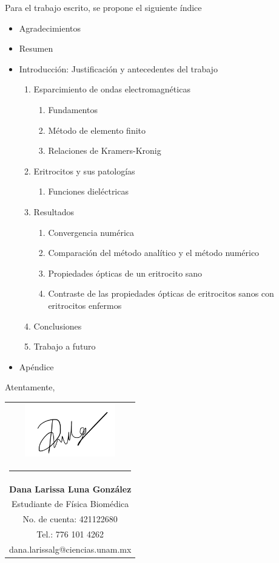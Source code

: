 \documentclass[11pt,letterpaper]{article}
\begin{document}
	Para el trabajo escrito, se propone el siguiente índice
	\begin{itemize}
		\setlength\itemsep{0.05em}
		\item  Agradecimientos
		\item  Resumen
		\item  Introducción: Justificación y antecedentes del trabajo
		\begin{enumerate}
			\item Esparcimiento de ondas electromagnéticas
			\begin{enumerate}[label=1.\arabic*]
				\item Fundamentos
				\item Método de elemento finito
				\item Relaciones de Kramers-Kronig
			\end{enumerate}
			\item Eritrocitos y sus patologías
			\begin{enumerate} [label=2.\arabic*]
				\item Funciones dieléctricas
			\end{enumerate}
			\item Resultados
			\begin{enumerate} [label=3.\arabic*]
				\item Convergencia numérica
				\item Comparación del método analítico y el método numérico
				\item Propiedades ópticas de un eritrocito sano
				\item  Contraste de las propiedades ópticas de eritrocitos sanos con eritrocitos enfermos
			\end{enumerate}
			\item Conclusiones
			\item Trabajo a futuro	
		\end{enumerate}
		\item Apéndice		
	\end{itemize}
	\newpage
	Atentamente,
	
	\vspace{1cm}
	{\hspace{0.7cm}\begin{tabular}{c}
		\includegraphics[height=2.3cm]{firma}\\[-0.5cm] %
		\rule{5.5cm}{0.4pt} \\[0.2cm]
		\textbf{Dana Larissa Luna González} \\
		Estudiante de Física Biomédica \\
		No. de cuenta: 421122680 \\
		Tel.: 776 101 4262 \\
		dana.larissalg@ciencias.unam.mx \\
	\end{tabular}}
\end{document}
